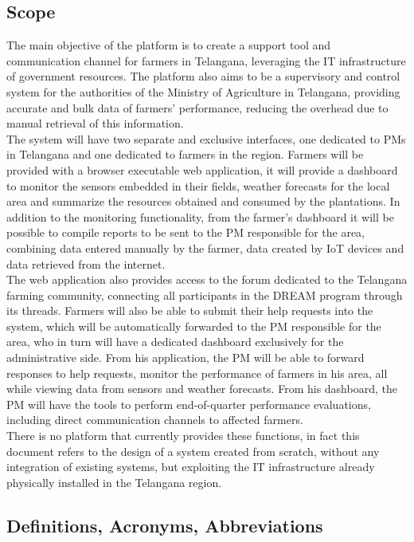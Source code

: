 \documentclass[10pt]{article} %
\begin{document}
\subsection{Scope}
The main objective of the platform is to create a support tool and communication channel for farmers in Telangana, 
leveraging the IT infrastructure of government resources. The platform also aims to be a 
supervisory and control system for the authorities of the Ministry of Agriculture in Telangana, 
providing accurate and bulk data of farmers' performance, reducing the overhead due to manual retrieval of this information.\\
The system will have two separate and exclusive interfaces, one dedicated to PMs in Telangana 
and one dedicated to farmers in the region. Farmers will be provided with a browser 
executable web application, it will provide a dashboard to monitor the sensors embedded 
in their fields, weather forecasts for the local area and summarize the resources 
obtained and consumed by the plantations. In addition to the monitoring functionality, 
from the farmer's dashboard it will be possible to compile reports to be sent to the PM 
responsible for the area, combining data entered manually by the farmer, data created by 
IoT devices and data retrieved from the internet.\\
The web application also provides access to the forum dedicated to the Telangana farming community, 
connecting all participants in the DREAM program through its threads.
Farmers will also be able to submit their help requests into the system, which will be automatically forwarded 
to the PM responsible for the area, who in turn will have a dedicated dashboard exclusively for the administrative side.
From his application, the PM will be able to forward responses to help requests, monitor the performance of 
farmers in his area, all while viewing data from sensors and weather forecasts.
From his dashboard, the PM will have the tools to perform end-of-quarter performance evaluations, 
including direct communication channels to affected farmers.\\
There is no platform that currently provides these functions, in fact this document refers to the design of a system 
created from scratch, without any integration of existing systems, but exploiting the IT infrastructure 
already physically installed in the Telangana region.

\subsection{Definitions, Acronyms, Abbreviations}
\end{document}
